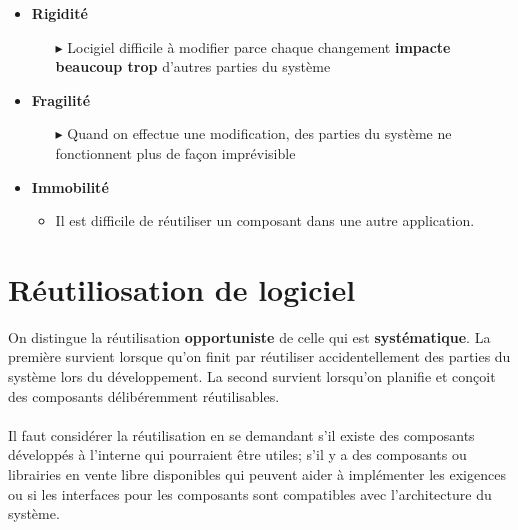 \documentclass[16pt]{report}
\begin{document}
\begin{multicols*}{2}
            \begin{itemize}
            \item \textbf{Rigidité}  
                \begin{itemize}
                    \item[$\blacktriangleright$] Locigiel difficile à modifier parce chaque changement 
                        \textbf{impacte beaucoup trop} d'autres parties du système  
                \end{itemize}
            \item \textbf{Fragilité}  
                \begin{itemize}
                    \item[$\blacktriangleright$] Quand on effectue une modification, des parties du système ne 
                        fonctionnent plus de façon imprévisible
                \end{itemize}       

            \item \textbf{Immobilité}  
                \begin{itemize}
                    \item Il est difficile de réutiliser un composant dans une autre application.  
                \end{itemize}
            \end{itemize}

        \section{Réutiliosation de logiciel}
        On distingue la réutilisation \textbf{opportuniste} de celle qui est \textbf{systématique}. La première 
        survient lorsque qu'on finit par réutiliser accidentellement des parties du système lors 
        du développement. La second survient lorsqu'on planifie et conçoit des composants délibéremment 
        réutilisables. 
        
        \paragraph{}
        Il faut considérer la réutilisation en se demandant s'il existe des composants développés à 
        l'interne qui pourraient être utiles; s'il y a des composants ou librairies en vente libre disponibles
        qui peuvent aider à implémenter les exigences ou si les interfaces pour les composants 
        sont compatibles avec l'architecture du système. 


\end{multicols*}
\end{document}
